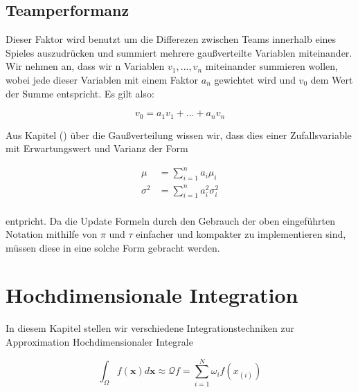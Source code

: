 \documentclass[12pt,a4paper]{scrartcl}
\numberwithin{equation}{section}
\begin{document}
  \subsection{Teamperformanz}
  Dieser Faktor wird benutzt um die Differezen zwischen Teams innerhalb eines Spieles auszudrücken und summiert mehrere gaußverteilte Variablen miteinander.
  Wir nehmen an, dass wir n Variablen $v_1,...,v_n$ miteinander summieren wollen, wobei jede dieser Variablen mit einem Faktor $a_n$ gewichtet wird und $v_0$ dem Wert der
  Summe entspricht. Es gilt also: 
  
  \begin{equation}
   v_0 = a_1v_1 + ... + a_nv_n 
  \end{equation}
  
  Aus Kapitel () über die Gaußverteilung wissen wir, dass dies einer Zufallsvariable mit Erwartungswert und Varianz der Form
  
  \begin{equation}
   \begin{split}
   \mu &= \sum_{i = 1}^n a_i \mu_i \\
   \sigma^2 &= \sum_{i = 1}^n a_i^2\sigma_i^2 \\ 
   \end{split}
  \end{equation}
  
  entpricht. Da die Update Formeln durch den Gebrauch der oben eingeführten Notation mithilfe von $\pi$ und $\tau$ einfacher und kompakter zu implementieren sind, 
  müssen diese in eine solche Form gebracht werden. 
  
\section{Hochdimensionale Integration}

In diesem Kapitel stellen wir verschiedene Integrationstechniken zur Approximation Hochdimensionaler Integrale

\begin{equation}
 \int_{\Omega} f(\mathbf{x}) d \mathbf{x} \approx \mathcal{Q}f = \sum_{i=1}^N \omega_i f(x_{(i)})
\end{equation}
\end{document}
